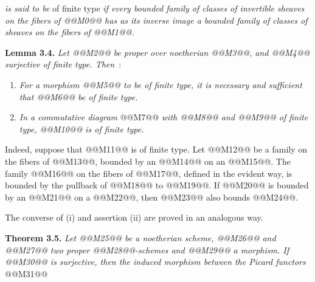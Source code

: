 \emph{is said to be} of finite type \emph{if every bounded family of classes of invertible sheaves on the fibers of @@M0@@ has as its inverse image a bounded family of classes of sheaves on the fibers of @@M1@@.}

\textbf{Lemma 3.4.} \emph{Let @@M2@@ be proper over noetherian @@M3@@, and @@M4@@ surjective of finite type. Then}~:
\begin{enumerate}[label=(\roman*)]
\item \emph{For a morphism @@M5@@ to be of finite type, it is necessary and sufficient that @@M6@@ be of finite type.}
\item \emph{In a commutative diagram}
@@M7@@
\emph{with @@M8@@ and @@M9@@ of finite type, @@M10@@ is of finite type.}
\end{enumerate}

Indeed, suppose that @@M11@@ is of finite type. Let @@M12@@ be a family on the fibers of @@M13@@, bounded by an @@M14@@ on an @@M15@@. The family @@M16@@ on the fibers of @@M17@@, defined in the evident way, is bounded by the pullback of @@M18@@ to @@M19@@. If @@M20@@ is bounded by an @@M21@@ on a @@M22@@, then @@M23@@ also bounds @@M24@@.

The converse of (i) and assertion (ii) are proved in an analogous way.

\textbf{Theorem 3.5.} \emph{Let @@M25@@ be a noetherian scheme, @@M26@@ and @@M27@@ two proper @@M28@@-schemes and @@M29@@ a morphism. If @@M30@@ is surjective, then the induced morphism between the Picard functors}
@@M31@@
